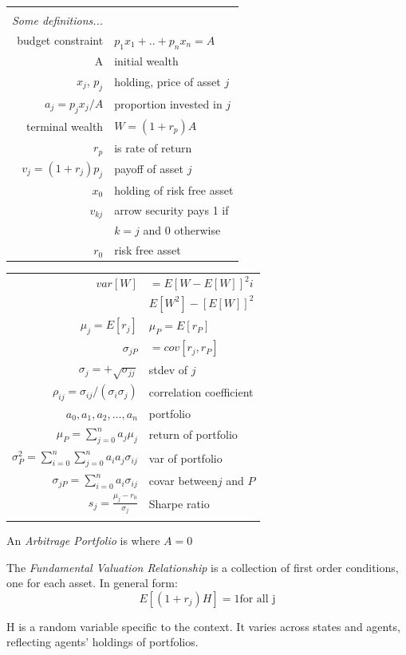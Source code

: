 \documentclass[a4paper,12pt]{article}
\begin{document}
\begin{multicols}{2}
\begin{tabular}{rl}
&\\
\emph{Some definitions...}&\\
budget constraint& $p_1x_1+..+p_nx_n=A$\\
A &initial wealth\\
$x_j$, $p_j$&holding, price of asset $j$\\
$a_j=p_jx_j/A$& proportion invested in $j$\\
terminal wealth& $W = (1 + r_p)A$\\
$r_p$& is rate of return  \\
$v_j=(1+r_j)p_j$ & payoff of asset $j$\\
$x_0$&holding of risk free asset\\
$v_{kj}$& arrow security pays 1 if\\
&$k=j$ and 0 otherwise\\
$r_0$&risk free asset\\
\end{tabular}
\begin{tabular}{rl}
$var[W]$&$=E[W-E[W]]^2i$\\
        &$E[W^2]-[E[W]]^2$\\
$\mu_j=E[r_j]$&$\mu_P=E[r_P]$\\
$\sigma_{jP}$&$=cov[r_j,r_P]$\\
$\sigma_j=+\sqrt{\sigma_{jj}}$&stdev of $j$\\
$\rho_{ij}=\sigma_{ij}/(\sigma_i\sigma_j)$& correlation coefficient\\
$a_0,a_1,a_2,\ldots,a_n$&portfolio\\
$\mu_P=\sum^n_{j=0}a_j\mu_j$&return of portfolio\\
$\sigma^2_P=\sum^n_{i=0}\sum^n_{j=0}a_ia_j\sigma_{ij}$&var of portfolio\\
$\sigma_{jP}=\sum^n_{i=0}a_i\sigma_{ij}$&covar between$j$ and $P$\\
$s_j=\frac{\mu_j-r_0}{\sigma_j}$& Sharpe ratio\\
&\\
\end{tabular}

An \emph{Arbitrage Portfolio} is where $A = 0$

The \emph{Fundamental Valuation Relationship} is a collection of first order
conditions, one for each asset. In general form: \[E[(1+r_j)H]=1 \mbox{for all
j}\]

H is a random variable specific to the context. It varies across states and
agents, reflecting agents' holdings of portfolios.



\end{multicols}
\end{document}
